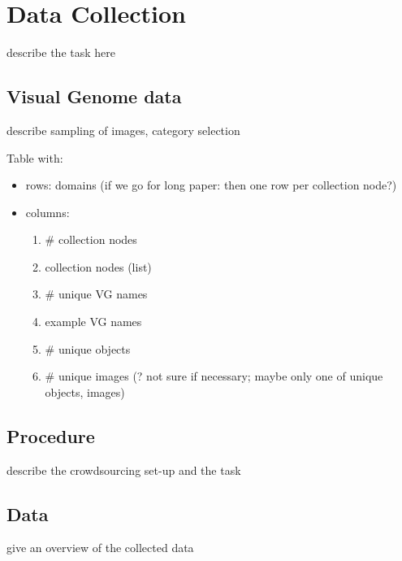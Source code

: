 \section{Data Collection}
\label{sec:task}


describe the task here

\subsection{Visual Genome data}

describe sampling of images, category selection

Table with:

\begin{itemize}
\item rows: domains (if we go for long paper: then one row per collection node?)
\item columns:
  \begin{enumerate}
  \item \# collection nodes
  \item collection nodes (list)
  \item \# unique VG names
  \item example VG names
  \item \# unique objects
  \item \# unique images (? not sure if necessary; maybe only one of unique {objects, images})
  \end{enumerate}
\end{itemize}

\subsection{Procedure} describe the crowdsourcing set-up and the task

\subsection{Data} give an overview of the collected data

